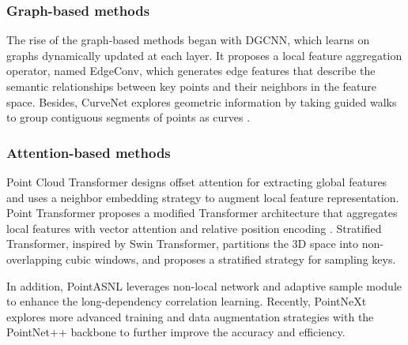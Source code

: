 \documentclass[lettersize,journal]{IEEEtran}
\begin{document}
\subsubsection*{\bf Graph-based methods}
The rise of the graph-based methods began with DGCNN\cite{dgcnn}, which learns on graphs 
dynamically updated at each layer. It proposes a local feature aggregation operator, named EdgeConv, which generates 
edge features that describe the semantic relationships between key points and their neighbors in the feature space. 
Besides, CurveNet explores geometric information by taking guided walks to group contiguous segments of points as curves \cite{curvenet}.

\subsubsection*{\bf Attention-based methods}
Point Cloud Transformer designs offset attention for extracting global features and uses a neighbor embedding strategy to augment local feature representation\cite{pct}. 
Point Transformer proposes a modified Transformer architecture that aggregates local features with vector attention and relative position encoding \cite{pointtransformer}.
Stratified Transformer\cite{stratified},  inspired by Swin Transformer\cite{swin}, partitions the 3D space into non-overlapping cubic windows,
and proposes a stratified strategy for sampling keys.

In addition, PointASNL\cite{pointasnl} leverages non-local network\cite{nonlocal} and adaptive sample module to enhance the long-dependency correlation learning.
Recently, PointNeXt\cite{pointnext} explores more advanced training and data augmentation strategies with the PointNet++ backbone 
to further improve the accuracy and efficiency.
\end{document}
